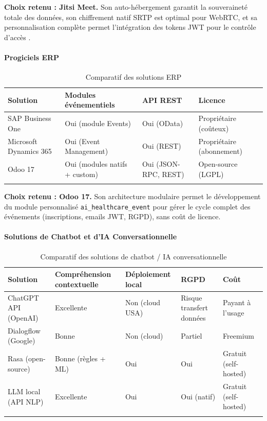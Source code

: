 \textbf{Choix retenu : Jitsi Meet.} Son auto-hébergement garantit la souveraineté totale des données, son chiffrement natif SRTP est optimal pour WebRTC, et sa personnalisation complète permet l'intégration des tokens JWT pour le contrôle d'accès \cite{webrtc}.

\paragraph{Progiciels ERP}

\begin{longtable}{|m{4cm}|m{3.5cm}|m{2.5cm}|m{2.5cm}|}
\hline
\textbf{Solution} & \textbf{Modules événementiels} & \textbf{API REST} & \textbf{Licence} \\
\hline
\endhead
\endfoot
\endlastfoot
\hline
SAP Business One & Oui (module Events) & Oui (OData) & Propriétaire (coûteux) \\
\hline
Microsoft Dynamics 365 & Oui (Event Management) & Oui (REST) & Propriétaire (abonnement) \\
\hline
Odoo 17 & Oui (modules natifs + custom) & Oui (JSON-RPC, REST) & Open-source (LGPL) \\
\hline
\captionsetup{justification=centering,margin=2cm}
\caption{Comparatif des solutions ERP}
\label{tab:erp}
\end{longtable}

\textbf{Choix retenu : Odoo 17.} Son architecture modulaire permet le développement du module personnalisé \texttt{ai\_healthcare\_event} pour gérer le cycle complet des événements (inscriptions, emails JWT, RGPD), sans coût de licence.

\paragraph{Solutions de Chatbot et d'IA Conversationnelle}

\begin{longtable}{|m{3.5cm}|m{3cm}|m{2cm}|m{2cm}|m{2cm}|}
\hline
\textbf{Solution} & \textbf{Compréhension contextuelle} & \textbf{Déploiement local} & \textbf{RGPD} & \textbf{Coût} \\
\hline
\endhead
\endfoot
\endlastfoot
\hline
ChatGPT API (OpenAI) & Excellente & Non (cloud USA) & Risque transfert données & Payant à l'usage \\
\hline
Dialogflow (Google) & Bonne & Non (cloud) & Partiel & Freemium \\
\hline
Rasa (open-source) & Bonne (règles + ML) & Oui & Oui & Gratuit (self-hosted) \\
\hline
LLM local (API NLP) & Excellente & Oui & Oui (natif) & Gratuit (self-hosted) \\
\hline
\captionsetup{justification=centering,margin=2cm}
\caption{Comparatif des solutions de chatbot / IA conversationnelle}
\label{tab:chatbot}
\end{longtable}

